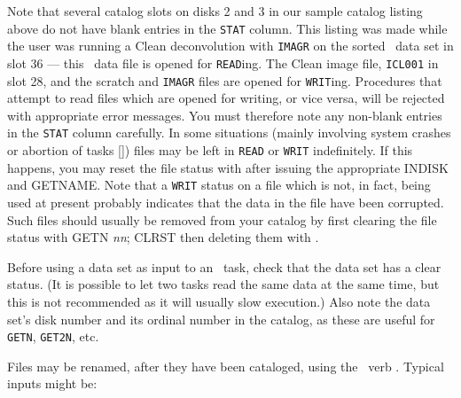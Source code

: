      Note that several catalog slots on disks 2 and 3 in our sample
catalog listing above do not have blank entries in the {\tt STAT}
column.  This listing was made while the user was running a Clean
deconvolution with {\tt IMAGR} on the sorted \uv\ data set in slot 36
--- this \uv\ data file is opened for {\tt READ}ing.  The Clean image
file, {\tt ICL001} in slot 28, and the scratch and {\tt IMAGR} files
are opened for {\tt WRIT}ing.  Procedures that attempt to read files
which are opened for writing, or vice versa, will be rejected with
appropriate error messages.  You must therefore note any non-blank
entries in the {\tt STAT} column carefully.  In some situations
(mainly involving system crashes or abortion of tasks [])
files may be left in {\tt READ} or {\tt WRIT} 
indefinitely.  If this happens, you may reset the file status with
{\us {} \CR} after issuing the appropriate {\us INDISK}
and \hbox{{\us GETNAME}}.  Note that a {\tt WRIT} status on a file
which is not, in fact, being used at present probably indicates that
the data in the file have been corrupted.  Such files should usually
be removed from your catalog by first clearing the file status with
{\us GETN {\it nn\/}; CLRST \CR} then deleting them with {\us
{} \CR}\@.

     Before using a data set as input to an \AIPS\ task, check that
the data set has a clear status.  (It is possible to let two tasks
read the same data at the same time, but this is not recommended as it
will usually slow execution.) Also note the data set's disk number and
its ordinal number in the catalog, as these are useful for {\tt GETN},
{\tt GET2N}, etc.


      Files may be renamed, after they have been cataloged, using
the \AIPS\ verb \hbox{{\tt {}}}.  Typical inputs might be:
\btd
{}
\etd

